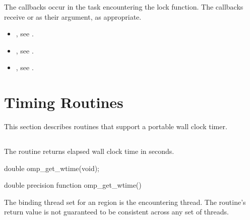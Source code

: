 The callbacks occur in the task encountering
the lock function.  The callbacks receive  or
  as their  argument, as appropriate.


\crossreferences
\begin{itemize}
\item {}, see
.
\item {}, see
.
\item {}, see
.
\end{itemize}

\section{Timing Routines}
\label{sec:Timing Routines}
This section describes routines that support a portable wall clock timer.











\subsection{}
\label{subsec:omp_get_wtime}
\summary
The  routine returns elapsed wall clock time in seconds.

\format
\begin{ccppspecific}
\begin{ompcFunction}
double omp_get_wtime(void);
\end{ompcFunction}
\end{ccppspecific}

\begin{fortranspecific}
\begin{ompfFunction}
double precision function omp_get_wtime()
\end{ompfFunction}
\end{fortranspecific}

\binding
The binding thread set for an  region is the encountering thread. The
routine's return value is not guaranteed to be consistent across any set of threads.


